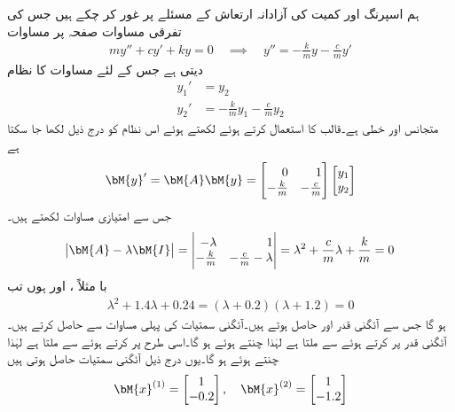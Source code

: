 ہم  اسپرنگ اور کمیت کی آزادانہ ارتعاش  کے مسئلے پر غور کر چکے ہیں جس کی تفرقی مساوات صفحہ  پر مساوات 
\begin{align}
my''+cy'+ky=0 \quad \implies \quad y''=-\frac{k}{m}y-\frac{c}{m}y'
\end{align}
 دیتی ہے جس کے لئے مساوات  کا نظام
\begin{align*}
y_1'&=y_2\\
y_2'&=-\frac{k}{m}y_1-\frac{c}{m}y_2
\end{align*}
 متجانس اور خطی ہے۔قالب کا استعمال کرتے ہوئے  لکھتے ہوئے اس نظام کو درج ذیل لکھا جا سکتا ہے
\begin{align}
\bM{y}'=\bM{A}\bM{y}=\begin{bmatrix*}[r] 0 & 1 \\ -\frac{k}{m}& -\frac{c}{m} \end{bmatrix*}\begin{bmatrix*}[r]  y_1 \\ y_2 \end{bmatrix*}
\end{align}
جس سے امتیازی مساوات لکھتے ہیں۔
\begin{align*}
\abs{\bM{A}-\lambda \bM{I}}=\begin{vmatrix*}[r] -\lambda & 1\\ -\frac{k}{m}& -\frac{c}{m}-\lambda \end{vmatrix*}=\lambda^2+\frac{c}{m}\lambda+\frac{k}{m}=0
\end{align*}
با مثلاً ،  اور  ہوں تب 
\begin{align*}
\lambda^2+1.4\lambda+0.24=(\lambda+0.2)(\lambda+1.2)=0
\end{align*}
ہو گا جس سے آئگنی قدر  اور  حاصل ہوتے ہیں۔آئگنی سمتیات  کی پہلی مساوات  سے حاصل کرتے ہیں۔آئگنی قدر  پر کرتے ہوئے   سے  ملتا ہے لہٰذا  چنتے ہوئے  ہو گا۔اسی طرح  پر کرتے ہوئے  سے  ملتا ہے لہٰذا  چنتے ہوئے  ہو گا۔یوں درج ذیل آئگنی سمتیات حاصل ہوتی ہیں
\begin{align*}
\bM{x}^{(1)}=\begin{bmatrix*} 1 \\ -0.2  \end{bmatrix*}, \quad \bM{x}^{(2)}=\begin{bmatrix*}  1 \\ -1.2 \end{bmatrix*}
\end{align*}
